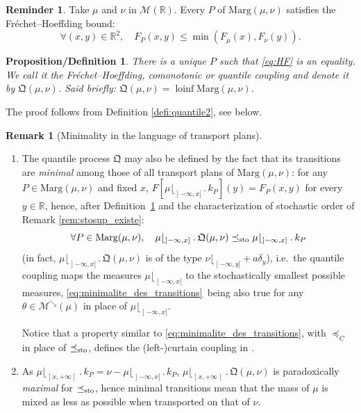 \documentclass[10pt,a4paper]{article}
\providecommand{\skpt}{\smallskip}
\providecommand{\ie}{i.e.\ }
\newcommand{\ldot}{\mathbin{.}}
\theoremstyle{plain}
\newtheorem{prodefinition}[them]{Proposition/Definition}
\theoremstyle{definition}
\newtheorem{rem}[them]{Remark}
\newtheorem{reminder}[them]{Reminder}
\newcommand{\como}{\mathfrak{Q}}
\newcommand{\m}{\mathcal{M}}
\newcommand{\ma}{\mathrm{Marg}}
\newcommand{\R}{\mathbb{R}}
\newcommand{\lcinf}{\operatorname{loinf}}
\newcommand{\leqc}{\preceq_{C}}
\newcommand{\leqs}{\preceq_{\text{\rm sto}}}
\newcommand{\mdec}{\mathcal{M}^{\scriptscriptstyle\searrow}}
\newcommand{\op}{\mathopen}
\newcommand{\clo}{\mathclose}
\begin{document}
\begin{reminder}Take $\mu$ and $\nu$ in $\m(\R)$. Every $P$ of $\ma(\mu,\nu)$ satisfies the Fréchet--Hoeffding bound:
\begin{equation}\label{eq:HF}
\forall(x,y)\in\R^2,\quad F_P(x,y)\leq \min(F_\mu(x),F_\nu(y)).
\end{equation}
\end{reminder}

\begin{prodefinition}\label{defi:quantile1}There is a unique $P$ such that \eqref{eq:HF} is an equality. We call it the Fréchet--Hoeffding, comonotonic or \emph{quantile coupling} and denote it by $\como(\mu,\nu)$. Said briefly: $\como(\mu,\nu)=\lcinf \ma(\mu,\nu)$.
\end{prodefinition}

The proof follows from Definition \ref{defi:quantile2}, see below.

\skpt
\begin{rem}[Minimality in the language of transport plans]\label{rem:q_is_mini}
\begin{enumerate}
\item
The quantile process $\como$ may also be defined by the fact that its transitions are \emph{minimal} among those of all transport plans of $\ma(\mu,\nu)$: for any $P\in\ma(\mu,\nu)$ and fixed $x$, $F[\mu\lfloor_{\op]-\infty,x]}{}\ldot k_P](y)= F_P(x,y)$ for every $y\in \R$, hence, after Definition~\ref{defi:quantile1} and the characterization of stochastic order of Remark \ref{rem:stosup_existe}:
\begin{equation}\label{eq:minimalite_des_transitions}\forall P\in\ma(\mu,\nu),\quad\mu\lfloor_{\op]-\infty,x]}{}{}\ldot\como(\mu,\nu)\leqs\mu\lfloor_{\op]-\infty,x]}{}{}\ldot k_P
\end{equation}
(in fact, $\mu\lfloor_{\op]-\infty,x]}{}{}\ldot\como(\mu,\nu)$ is of the type $\nu\lfloor_{\op]-\infty,y[}+a\delta_y$), \ie the quantile coupling maps the measures $\mu\lfloor_{\op]-\infty,x]}$ to the stochastically smallest possible measures, \eqref{eq:minimalite_des_transitions}~being also true for any $\theta\in \mdec(\mu)$ in place of $\mu\lfloor_{\op]-\infty,x]}$.

Notice that a property similar to \eqref{eq:minimalite_des_transitions}, with $\leqc$ in place of $\leqs$, defines the (left\nobreakdash-)curtain coupling in \cite{BJ}.

\item
As $\mu\lfloor_{\op]x,+\infty\clo[}{}{}\ldot k_P=\nu-\mu\lfloor_{\op]-\infty,x]}{}{}\ldot k_{P}$, $\mu\lfloor_{\op]x,+\infty\clo[}{}{}\ldot\como(\mu,\nu)$ is paradoxically \emph{maximal} for $\leqs$, hence minimal transitions mean that the mass of $\mu$ is mixed as less as possible when transported on that of $\nu$.
\end{enumerate}
\end{rem}
\end{document}

